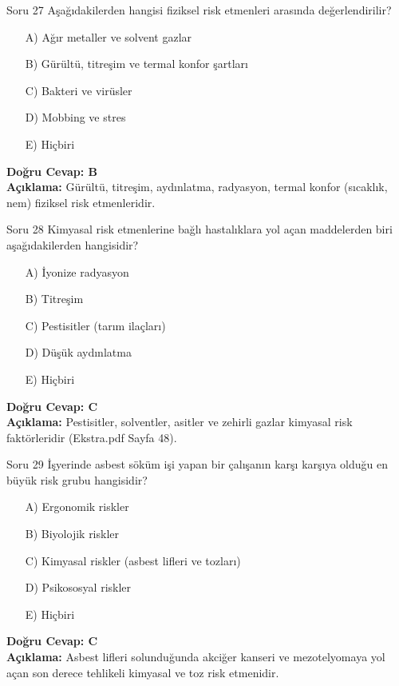 \documentclass[12pt,a4paper]{article}
\begin{document}
\begin{testcard}{Soru 27}
    Aşağıdakilerden hangisi fiziksel risk etmenleri arasında değerlendirilir?
    \begin{itemize}
        \item[A)] Ağır metaller ve solvent gazlar
        \item[B)] Gürültü, titreşim ve termal konfor şartları
        \item[C)] Bakteri ve virüsler
        \item[D)] Mobbing ve stres
        \item[E)] Hiçbiri
    \end{itemize}
    \tcblower
    \textbf{Doğru Cevap: B} \\
    \textbf{Açıklama:} Gürültü, titreşim, aydınlatma, radyasyon, termal konfor (sıcaklık, nem) fiziksel risk etmenleridir.
\end{testcard}

\begin{testcard}{Soru 28}
    Kimyasal risk etmenlerine bağlı hastalıklara yol açan maddelerden biri aşağıdakilerden hangisidir?
    \begin{itemize}
        \item[A)] İyonize radyasyon
        \item[B)] Titreşim
        \item[C)] Pestisitler (tarım ilaçları)
        \item[D)] Düşük aydınlatma
        \item[E)] Hiçbiri
    \end{itemize}
    \tcblower
    \textbf{Doğru Cevap: C} \\
    \textbf{Açıklama:} Pestisitler, solventler, asitler ve zehirli gazlar kimyasal risk faktörleridir (Ekstra.pdf Sayfa 48).
\end{testcard}

\begin{testcard}{Soru 29}
    İşyerinde asbest söküm işi yapan bir çalışanın karşı karşıya olduğu en büyük risk grubu hangisidir?
    \begin{itemize}
        \item[A)] Ergonomik riskler
        \item[B)] Biyolojik riskler
        \item[C)] Kimyasal riskler (asbest lifleri ve tozları)
        \item[D)] Psikososyal riskler
        \item[E)] Hiçbiri
    \end{itemize}
    \tcblower
    \textbf{Doğru Cevap: C} \\
    \textbf{Açıklama:} Asbest lifleri solunduğunda akciğer kanseri ve mezotelyomaya yol açan son derece tehlikeli kimyasal ve toz risk etmenidir.
\end{testcard}
\end{document}
